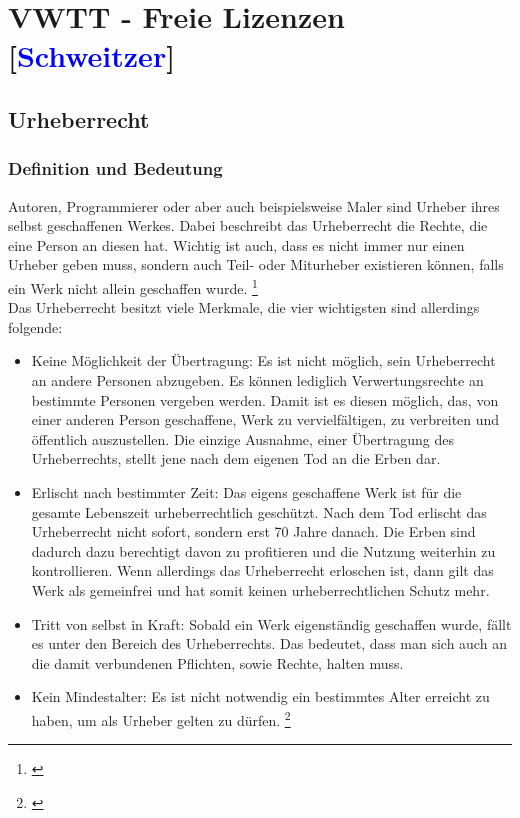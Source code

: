\documentclass[titlepage,12pt,twoside]{article}
\begin{document}
\newpage

\section{VWTT - Freie Lizenzen [\textcolor{blue}{Schweitzer}]}
\subsection{Urheberrecht}
\subsubsection{Definition und Bedeutung}
Autoren, Programmierer oder aber auch beispielsweise Maler sind Urheber ihres selbst geschaffenen Werkes. 
Dabei beschreibt das Urheberrecht die Rechte, die eine Person an diesen hat. Wichtig ist auch, dass es nicht 
immer nur einen Urheber geben muss, sondern auch Teil- oder Miturheber existieren können, falls ein Werk 
nicht allein geschaffen wurde. \footnote{\cite{Saferinternet.p7}} \\
Das Urheberrecht besitzt viele Merkmale, die vier wichtigsten sind allerdings folgende: \\
\begin{itemize}
	\item Keine Möglichkeit der Übertragung: Es ist nicht möglich, sein Urheberrecht an andere Personen 
	abzugeben. Es können lediglich Verwertungsrechte an bestimmte Personen vergeben werden. Damit ist es 
	diesen möglich, das, von einer anderen Person geschaffene, Werk zu vervielfältigen, zu verbreiten und 
	öffentlich auszustellen. Die einzige Ausnahme, einer Übertragung des Urheberrechts, stellt jene nach dem 
	eigenen Tod an die Erben dar.
	\item Erlischt nach bestimmter Zeit: Das eigens geschaffene Werk ist für die gesamte Lebenszeit 
	urheberrechtlich geschützt. Nach dem Tod erlischt das Urheberrecht nicht sofort, sondern erst 70 Jahre 
	danach. Die Erben sind dadurch dazu berechtigt davon zu profitieren und die Nutzung weiterhin zu 
	kontrollieren. Wenn allerdings das Urheberrecht erloschen ist, dann gilt das Werk als gemeinfrei und hat 
	somit keinen urheberrechtlichen Schutz mehr.
	\item Tritt von selbst in Kraft: Sobald ein Werk eigenständig geschaffen wurde, fällt es unter den Bereich 
	des Urheberrechts. Das bedeutet, dass man sich auch an die damit verbundenen Pflichten, sowie Rechte, 
	halten muss.
	\item Kein Mindestalter: Es ist nicht notwendig ein bestimmtes Alter erreicht zu haben, um als Urheber 
	gelten zu dürfen. \footnote{\cite{Saferinternet.p7}} \\
\end{itemize}
\end{document}
